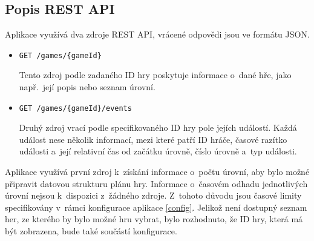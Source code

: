 \documentclass[
  digital, %
  oneside, %
  table,   %
  nolof,     %
  nolot,     %
]{fithesis3}
\begin{document}
\subsection{Popis REST API}
Aplikace využívá dva zdroje REST API, vrácené odpovědi jsou ve formátu JSON.
\begin{itemize}
  \item \verb|GET /games/{gameId}|\par
  Tento zdroj podle zadaného ID hry poskytuje informace o~dané hře, jako např.~její popis nebo seznam úrovní.
  \item \verb|GET /games/{gameId}/events|\par
  Druhý zdroj vrací podle specifikovaného ID hry pole jejích událostí. Každá událost nese několik informací, mezi které patří ID hráče, časové razítko události a~její relativní čas od začátku úrovně, číslo úrovně a~typ události.
\end{itemize}
Aplikace využívá první zdroj k~získání informace o~počtu úrovní, aby bylo možné připravit datovou strukturu plánu hry. Informace o~časovém odhadu jednotlivých úrovní nejsou k~dispozici z~žádného zdroje. Z~tohoto důvodu jsou časové limity specifikovány v~rámci konfigurace aplikace \ref{config}. Jelikož není dostupný seznam her, ze kterého by bylo možné hru vybrat, bylo rozhodnuto, že ID hry, která má být zobrazena, bude také součástí konfigurace.\par
\end{document}
